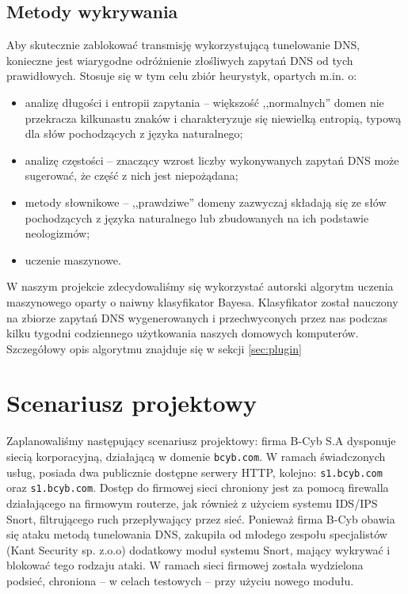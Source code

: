 \documentclass{eiti-raport}
\begin{document}
\subsection{Metody wykrywania} \label{sec:wykrywanie}
Aby skutecznie zablokować transmisję wykorzystującą tunelowanie DNS, konieczne jest wiarygodne odróżnienie złośliwych zapytań DNS od tych prawidłowych. Stosuje się w tym celu zbiór heurystyk, opartych m.in. o:
\begin{itemize}
	\item analizę długości i entropii zapytania -- większość ,,normalnych'' domen nie przekracza kilkunastu znaków i charakteryzuje się niewielką entropią, typową dla słów pochodzących z języka naturalnego;
	\item analizę częstości -- znaczący wzrost liczby wykonywanych zapytań DNS może sugerować, że część z nich jest niepożądana;
	\item metody słownikowe -- ,,prawdziwe'' domeny zazwyczaj składają się ze słów pochodzących z języka naturalnego lub zbudowanych na ich podstawie neologizmów;
	\item uczenie maszynowe.
\end{itemize}
W naszym projekcie zdecydowaliśmy się wykorzystać autorski algorytm uczenia maszynowego oparty o naiwny klasyfikator Bayesa. Klasyfikator został nauczony na zbiorze zapytań DNS wygenerowanych i przechwyconych przez nas podczas kilku tygodni codziennego użytkowania naszych domowych komputerów. Szczegółowy opis algorytmu znajduje się w sekcji \ref{sec:plugin} 

\section{Scenariusz projektowy} \label{sec:scenariusz}
Zaplanowaliśmy następujący scenariusz projektowy: firma B-Cyb S.A dysponuje siecią korporacyjną, działającą w domenie \texttt{bcyb.com}. W ramach świadczonych usług, posiada dwa publicznie dostępne serwery HTTP, kolejno: \texttt{s1.bcyb.com} oraz \texttt{s1.bcyb.com}. Dostęp do firmowej sieci chroniony jest za pomocą firewalla działającego na firmowym routerze, jak również z użyciem systemu IDS/IPS Snort, filtrującego ruch przepływający przez sieć. Ponieważ firma B-Cyb obawia się ataku metodą tunelowania DNS, zakupiła od młodego zespołu specjalistów (Kant Security sp. z.o.o) dodatkowy moduł systemu Snort, mający wykrywać i blokować tego rodzaju ataki. W ramach sieci firmowej została wydzielona podsieć, chroniona -- w celach testowych -- przy użyciu nowego modułu. 
\end{document}
